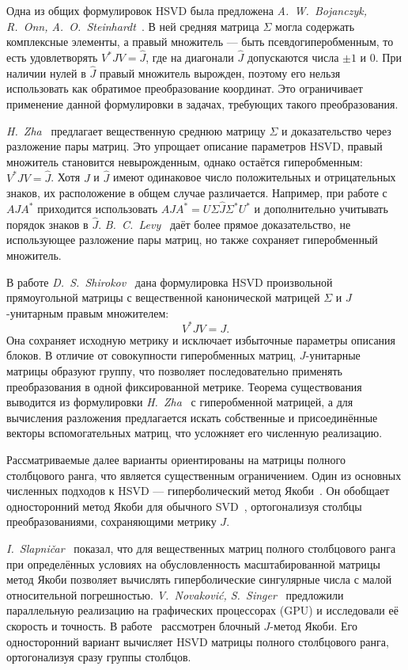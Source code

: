 \documentclass[a4paper,12pt]{article}
\theoremstyle{csstyle}
\begin{document}
Одна из общих формулировок HSVD была предложена
\textit{A.~W.~Bojanczyk, R.~Onn, A.~O.~Steinhardt}~\cite{BOS}.
В ней средняя матрица $\Sigma$ могла содержать комплексные элементы,
а правый множитель --- быть псевдогиперобменным, то есть удовлетворять
$V^*JV=\hat J$, где на диагонали $\hat J$ допускаются числа $\pm1$ и $0$.
При наличии нулей в $\hat J$ правый множитель вырожден,
поэтому его нельзя использовать как обратимое преобразование координат.
Это ограничивает применение данной формулировки в задачах,
требующих такого преобразования.

\textit{H.~Zha}~\cite{Zha} предлагает вещественную среднюю матрицу $\Sigma$
и доказательство через разложение пары матриц.
Это упрощает описание параметров HSVD, правый множитель становится невырожденным, однако остаётся
гиперобменным: $V^*JV=\hat J$.
Хотя $J$ и $\hat J$ имеют одинаковое число положительных и отрицательных знаков,
их расположение в общем случае различается.
Например, при работе с $AJA^*$ приходится использовать
$AJA^*=U\Sigma\hat J\Sigma^*U^*$ и дополнительно учитывать порядок знаков в $\hat J$.
\textit{B.~C.~Levy}~\cite{Levy} даёт более прямое доказательство,
не использующее разложение пары матриц, но также сохраняет гиперобменный множитель.

В работе \textit{D.~S.~Shirokov}~\cite{Shirokov} дана формулировка
HSVD произвольной прямоугольной матрицы с вещественной
канонической матрицей $\Sigma$ и $J$-унитарным правым множителем:
\[
V^*JV=J.
\]
Она сохраняет исходную метрику и исключает избыточные параметры
описания блоков. В отличие от совокупности гиперобменных матриц,
$J$-унитарные матрицы образуют группу, что позволяет последовательно
применять преобразования в одной фиксированной метрике.
Теорема существования выводится из формулировки
\textit{H.~Zha}~\cite{Zha} с гиперобменной матрицей,
а для вычисления разложения предлагается искать собственные и присоединённые
векторы вспомогательных матриц, что усложняет его численную реализацию.

Рассматриваемые далее варианты ориентированы на матрицы полного столбцового ранга,
что является существенным ограничением.
Один из основных численных подходов к HSVD --- гиперболический
метод Якоби~\cite{Jacobi}. Он обобщает односторонний метод Якоби
для обычного SVD~\cite{Golub}, ортогонализуя столбцы преобразованиями,
сохраняющими метрику $J$.

\textit{I.~Slapni\v{c}ar}~\cite{Jacobi} показал, что для вещественных
матриц полного столбцового ранга при определённых условиях
на обусловленность масштабированной матрицы метод Якоби позволяет вычислять
гиперболические сингулярные числа с малой относительной погрешностью.
\textit{V.~Novakovi\'c, S.~Singer}~\cite{GPU-HSVD} предложили
параллельную реализацию на графических процессорах (GPU)
и исследовали её скорость и точность.
В работе~\cite{FullBlockJJacobi} рассмотрен блочный $J$-метод Якоби.
Его односторонний вариант вычисляет HSVD матрицы полного столбцового ранга,
ортогонализуя сразу группы столбцов.
\end{document}
